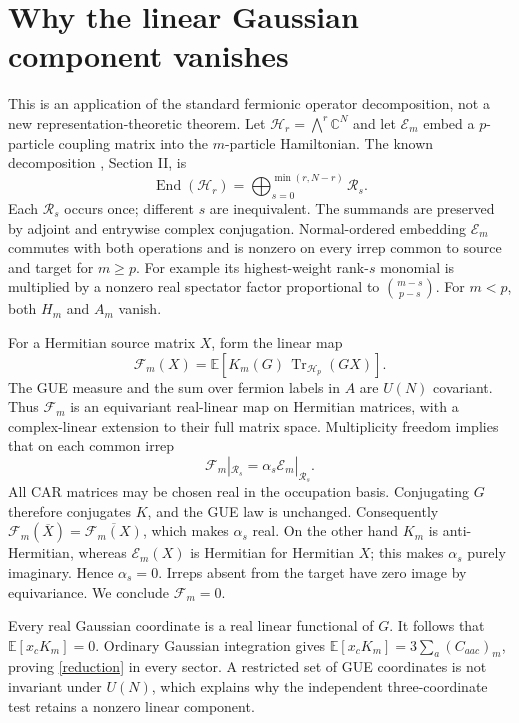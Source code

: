 \documentclass[11pt,a4paper]{article}
\newcommand{\Tr}{\operatorname{Tr}}
\newcommand{\E}{\mathbb E}
\newcommand{\HH}{\mathcal H}
\begin{document}
\newpage
\appendix
\section{Why the linear Gaussian component vanishes}
This is an application of the standard fermionic operator decomposition,
not a new representation-theoretic theorem. Let
$\HH_r=\bigwedge^r\mathbb C^N$ and let $\mathcal E_m$ embed a $p$-particle
coupling matrix into the $m$-particle Hamiltonian. The known decomposition
\cite{kota}, Section II, is
\begin{equation}
 \operatorname{End}(\HH_r)=
 \bigoplus_{s=0}^{\min(r,N-r)}\mathcal R_s.
\end{equation}
Each $\mathcal R_s$ occurs once; different $s$ are inequivalent. The
summands are preserved by adjoint and entrywise complex conjugation.
Normal-ordered embedding $\mathcal E_m$ commutes with both operations
and is nonzero on every irrep common to source and target for $m\ge p$.
For example its highest-weight rank-$s$ monomial is multiplied by a
nonzero real spectator factor proportional to $\binom{m-s}{p-s}$.
For $m<p$, both $H_m$ and $A_m$ vanish.

For a Hermitian source matrix $X$, form the linear map
\begin{equation}
 \mathcal F_m(X)=\E\left[K_m(G)\,\Tr_{\HH_p}(GX)\right].
\end{equation}
The GUE measure and the sum over fermion labels in $A$ are $U(N)$
covariant. Thus $\mathcal F_m$ is an equivariant real-linear map on
Hermitian matrices, with a complex-linear extension to their full matrix
space. Multiplicity freedom implies that on each common irrep
\begin{equation}
 \mathcal F_m|_{\mathcal R_s}=\alpha_s\mathcal E_m|_{\mathcal R_s}.
\end{equation}
All CAR matrices may be chosen real in the occupation basis. Conjugating
$G$ therefore conjugates $K$, and the GUE law is unchanged. Consequently
$\mathcal F_m(\overline X)=\overline{\mathcal F_m(X)}$, which makes
$\alpha_s$ real. On the other hand $K_m$ is anti-Hermitian, whereas
$\mathcal E_m(X)$ is Hermitian for Hermitian $X$; this makes $\alpha_s$
purely imaginary. Hence $\alpha_s=0$. Irreps absent from the target have
zero image by equivariance. We conclude $\mathcal F_m=0$.

Every real Gaussian coordinate is a real linear functional of $G$.
It follows that $\E[x_cK_m]=0$. Ordinary Gaussian integration gives
$\E[x_cK_m]=3\sum_a(C_{aac})_m$, proving \eqref{reduction} in every
sector. A restricted set of GUE coordinates is not invariant under
$U(N)$, which explains why the independent three-coordinate test retains
a nonzero linear component.
\end{document}
